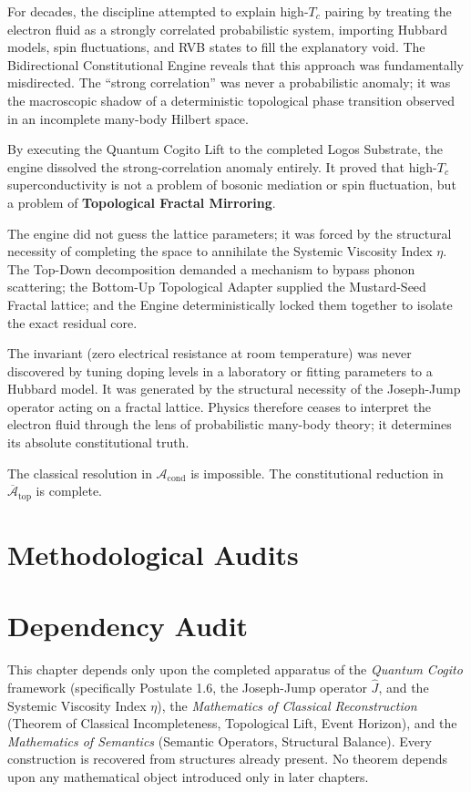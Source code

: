 \documentclass[11pt,openany]{extbook}
\newenvironment{dependencyaudit}{\section*{Dependency Audit}}{}
\theoremstyle{plain}
\theoremstyle{definition}
\begin{document}
For decades, the discipline attempted to explain high-$T_c$ pairing by treating the electron fluid as a strongly correlated probabilistic system, importing Hubbard models, spin fluctuations, and RVB states to fill the explanatory void. The Bidirectional Constitutional Engine reveals that this approach was fundamentally misdirected. The ``strong correlation'' was never a probabilistic anomaly; it was the macroscopic shadow of a deterministic topological phase transition observed in an incomplete many-body Hilbert space.

By executing the Quantum Cogito Lift to the completed Logos Substrate, the engine dissolved the strong-correlation anomaly entirely. It proved that high-$T_c$ superconductivity is not a problem of bosonic mediation or spin fluctuation, but a problem of \textbf{Topological Fractal Mirroring}.

The engine did not guess the lattice parameters; it was forced by the structural necessity of completing the space to annihilate the Systemic Viscosity Index $\eta$. The Top-Down decomposition demanded a mechanism to bypass phonon scattering; the Bottom-Up Topological Adapter supplied the Mustard-Seed Fractal lattice; and the Engine deterministically locked them together to isolate the exact residual core.

The invariant (zero electrical resistance at room temperature) was never discovered by tuning doping levels in a laboratory or fitting parameters to a Hubbard model. It was generated by the structural necessity of the Joseph-Jump operator acting on a fractal lattice. Physics therefore ceases to interpret the electron fluid through the lens of probabilistic many-body theory; it determines its absolute constitutional truth.

The classical resolution in $\mathcal{A}_{\text{cond}}$ is impossible. The constitutional reduction in $\overline{\mathcal{A}}_{\text{top}}$ is complete.

\section{Methodological Audits}

\begin{dependencyaudit}
\noindent This chapter depends only upon the completed apparatus of the \textit{Quantum Cogito} framework (specifically Postulate 1.6, the Joseph-Jump operator $\hat{J}$, and the Systemic Viscosity Index $\eta$), the \textit{Mathematics of Classical Reconstruction} (Theorem of Classical Incompleteness, Topological Lift, Event Horizon), and the \textit{Mathematics of Semantics} (Semantic Operators, Structural Balance). Every construction is recovered from structures already present. No theorem depends upon any mathematical object introduced only in later chapters.
\end{dependencyaudit}
\end{document}
